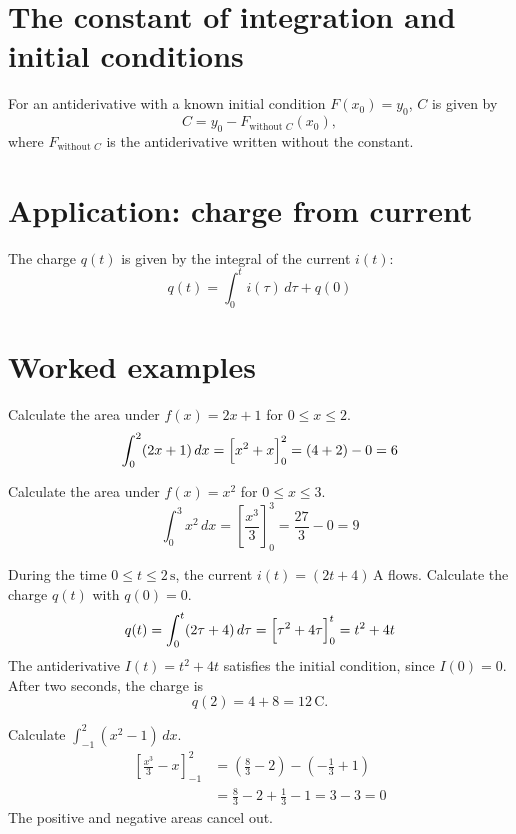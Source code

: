 \section{The constant of integration and initial conditions}
\label{c14:sec:startvillkor}
For an antiderivative with a known initial condition $F(x_0) = y_0$, $C$ is given by
\[
  C = y_0 - F_{\text{without }C}(x_0),
\]
where $F_{\text{without }C}$ is the antiderivative written without the constant.

\section{Application: charge from current}
\label{c14:sec:laddning}
The charge $q(t)$ is given by the integral of the current $i(t)$:
\[
  q(t) = \int_0^t i(\tau)\,d\tau + q(0)
\]

\section{Worked examples}
\label{c14:sec:typexempel}

\begin{exempel}
Calculate the area under $f(x) = 2x + 1$ for $0 \leq x \leq 2$.
\[
  \int_0^2 (2x + 1)\,dx = \Bigl[x^2 + x\Bigr]_0^2 = (4 + 2) - 0 = 6
\]
\end{exempel}

\begin{exempel}
Calculate the area under $f(x) = x^2$ for $0 \leq x \leq 3$.
\[
  \int_0^3 x^2\,dx = \left[\frac{x^3}{3}\right]_0^3 = \frac{27}{3} - 0 = 9
\]
\end{exempel}

\begin{exempel}
During the time $0 \leq t \leq 2\,\text{s}$, the current $i(t) = (2t + 4)\,\text{A}$ flows.
Calculate the charge $q(t)$ with $q(0) = 0$.
\[
  q(t) = \int_0^t (2\tau + 4)\,d\tau = \Bigl[\tau^2 + 4\tau\Bigr]_0^t = t^2 + 4t
\]
The antiderivative $I(t) = t^2 + 4t$ satisfies the initial condition, since $I(0) = 0$. After two
seconds, the charge is
\[
  q(2) = 4 + 8 = 12\,\text{C}.
\]
\end{exempel}

\begin{exempel}
Calculate $\displaystyle\int_{-1}^{2} (x^2 - 1)\,dx$.
\begin{align*}
  \left[\frac{x^3}{3} - x\right]_{-1}^{2}
    &= \left(\frac{8}{3} - 2\right) - \left(-\frac{1}{3} + 1\right) \\
    &= \frac{8}{3} - 2 + \frac{1}{3} - 1 = 3 - 3 = 0
\end{align*}
The positive and negative areas cancel out.
\end{exempel}
